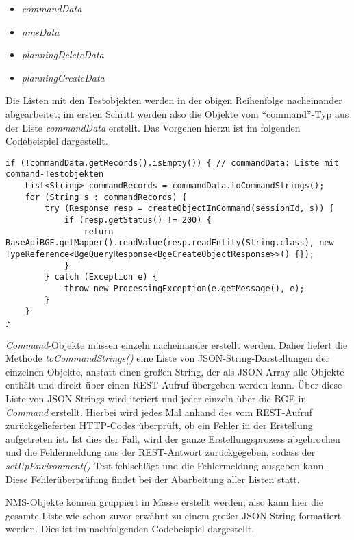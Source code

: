 \begin{itemize}
    \item \textit{commandData}
    \item \textit{nmsData}
    \item \textit{planningDeleteData}
    \item \textit{planningCreateData}
\end{itemize}

Die Listen mit den Testobjekten werden in der obigen Reihenfolge nacheinander abgearbeitet; im ersten Schritt werden also die Objekte vom \enquote{command}-Typ aus der Liste \textit{commandData} erstellt. Das Vorgehen hierzu ist im folgenden Codebeispiel dargestellt.

\begin{lstlisting}[caption=Erstellen von \textit{Command}-Objekten über die BGE, label=createCommandTestObjects,style=Javastyle]
if (!commandData.getRecords().isEmpty()) { // commandData: Liste mit command-Testobjekten
    List<String> commandRecords = commandData.toCommandStrings();
    for (String s : commandRecords) {
        try (Response resp = createObjectInCommand(sessionId, s)) {
            if (resp.getStatus() != 200) {
                return BaseApiBGE.getMapper().readValue(resp.readEntity(String.class), new TypeReference<BgeQueryResponse<BgeCreateObjectResponse>>() {});
            }
        } catch (Exception e) {
            throw new ProcessingException(e.getMessage(), e);
        }
    }
}
\end{lstlisting}

\textit{Command}-Objekte müssen einzeln nacheinander erstellt werden. Daher liefert die Methode \textit{toCommandStrings()} eine Liste von \ac{JSON}-String-Darstellungen der einzelnen Objekte, anstatt einen großen String, der als \ac{JSON}-Array alle Objekte enthält und direkt über einen \ac{REST}-Aufruf übergeben werden kann. Über diese Liste von \ac{JSON}-Strings wird iteriert und jeder einzeln über die \ac{BGE} in \textit{Command} erstellt. Hierbei wird jedes Mal anhand des vom \ac{REST}-Aufruf zurückgelieferten \ac{HTTP}-Codes überprüft, ob ein Fehler in der Erstellung aufgetreten ist. Ist dies der Fall, wird der ganze Erstellungsprozess abgebrochen und die Fehlermeldung aus der \ac{REST}-Antwort zurückgegeben, sodass der \textit{setUpEnvironment()}-Test fehlschlägt und die Fehlermeldung ausgeben kann. Diese Fehlerüberprüfung findet bei der Abarbeitung aller Listen statt.

\ac{NMS}-Objekte können gruppiert in Masse erstellt werden; also kann hier die gesamte Liste wie schon zuvor erwähnt zu einem großer \ac{JSON}-String formatiert werden. Dies ist im nachfolgenden Codebeispiel dargestellt.

